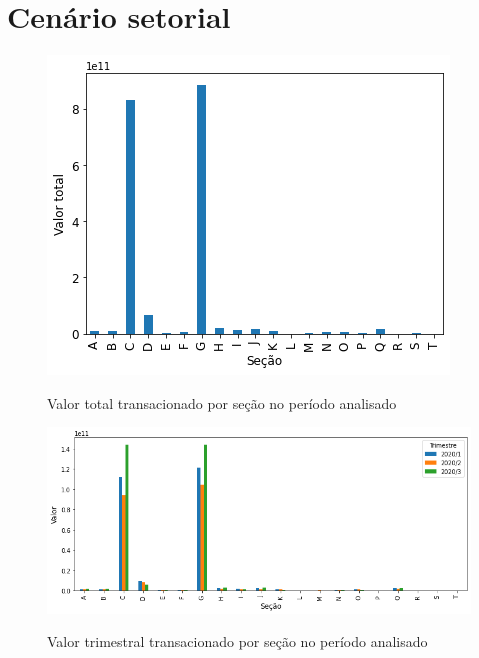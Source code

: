 \section{Cenário setorial}

\begin{figure}[htb]
	\centering
    \caption{Valor total transacionado por seção no período analisado}
    \includegraphics[scale=0.7]{images/base-de-dados-15.1-valor-total-por-secao.png}
    \label{fig:pandemia:base-de-dados-15.1-valor-total-por-secao}
    \fdadospesquisa
\end{figure}

\begin{figure}[htb]
	\centering
    \caption{Valor trimestral transacionado por seção no período analisado}
    \includegraphics[scale=0.7]{images/base-de-dados-22-valor-trimestral-por-secao.png}
    \label{fig:pandemia:base-de-dados-22-valor-trimestral-por-secao}
    \fdadospesquisa
\end{figure}

